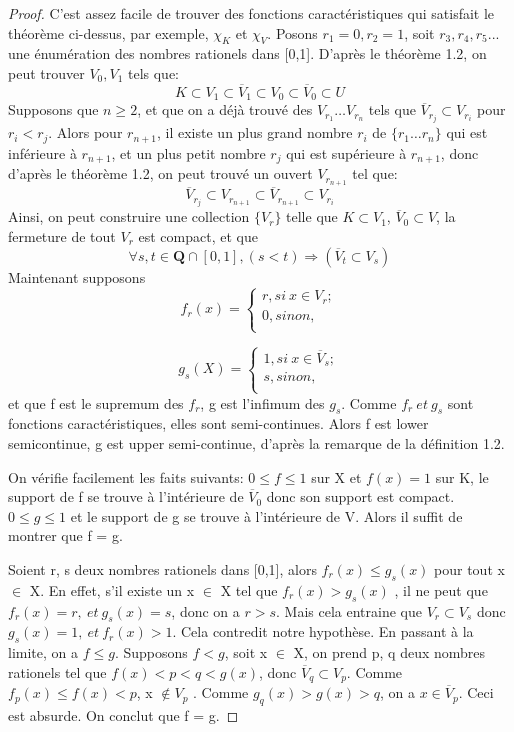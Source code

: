 \documentclass{article}
\begin{document}
\begin{proof}
C'est assez facile de trouver des fonctions caractéristiques qui satisfait le théorème ci-dessus, par exemple, $\chi _{K}$ et $\chi _{V}$.  
Posons $r_{1}=0, r_{2}=1$, soit $r_{3}, r_{4}, r_{5} ...$ une énumération des nombres rationels dans [0,1]. D'après le théorème 1.2, on peut trouver $V_{0}, V_{1}$ tels que: 
\[K \subset V_{1} \subset \overline{V}_{1} \subset V_{0} \subset \overline{V}_{0}\subset U\]
Supposons que $n \geq 2$, et que on a déjà trouvé des $V_{r_{1}} \dots V_{r_{n}}$ tels que $\overline{V}_{r_{j}} \subset V_{r_{i}}$ pour $ r_{i} < r_{j} $. Alors pour $r_{n+1}$, il existe un plus grand nombre $r_{i}$ de $\{r_{1} \dots r_{n}\}$ qui est inférieure à $r_{n+1}$, et un plus petit nombre $r_{j}$ qui est supérieure à $r_{n+1}$, donc d'après le théorème 1.2, on peut trouvé un ouvert $V_{r_{n+1}}$ tel que:
\[\overline{V}_{r_{j}} \subset V_{r_{n+1}} \subset \overline{V}_{r_{n+1}} \subset V_{r_{i}} \]
Ainsi, on peut construire une collection $\{V_{r}\}$ telle que $K \subset V_{1}$, $\overline{V}_{0} \subset V$, la fermeture de tout $V_{r}$ est compact, et que 
\[ \forall s,t \in \mathbf{Q} \cap [0,1],  ( s < t )  \Rightarrow  (\overline{V}_{t} \subset V_{s} )\]
Maintenant supposons 
\[ f_{r} (x)= 
    \begin{cases}
    r, si\ x \in V_{r} ; \\
    0, sinon, \\
    \end{cases} \]

   \[ 
   g_{s}(X)=
   \begin{cases}
   1, si\ x \in \overline{V}_{s}; \\
   s, sinon, \\   
   \end{cases}
\]
et que f est le supremum des $f_{r}$, g est l'infimum des $g_{s}$. Comme $f_{r} \ et \ g_{s}$ sont fonctions caractéristiques, elles sont semi-continues. Alors f est lower semicontinue, g est upper semi-continue, d'après la remarque de la définition 1.2. \par
On vérifie facilement les faits suivants: $0 \leq f \leq 1$ sur X et $f(x)=1$ sur K, le support de f se trouve à l'intérieure de $\overline{V}_{0}$ donc son support est compact. $0 \leq g \leq 1$ et le support de g se trouve à l'intérieure de V. Alors il suffit de montrer que f = g.\par 
Soient r, s deux nombres rationels dans [0,1], alors $f_{r}(x) \leq  g_{s}(x)$ pour tout x $\in$ X. En effet, s'il existe un x $\in$ X tel que $f_{r}(x) > g_{s}(x)$ , il ne peut que $f_{r}(x)=r, \ et \  g_{s} (x)= s $, donc on a $r > s$. Mais cela entraine que $V_{r} \subset V_{s}$ donc $g_{s}(x) =1, \ et \ f_{r}(x) > 1$. Cela contredit notre hypothèse. 
En passant à la limite, on a $f \leq g$. Supposons $f < g$,  soit x $\in$ X, on prend p, q deux nombres rationels tel que $ f(x)< p < q < g(x) $, donc $\overline{V}_{q} \subset V_{p}$. 
Comme $f_{p}(x) \leq f(x) < p$, x $\notin V_{p}$ . Comme $g_{q} (x) > g(x) > q$, on a $x \in \overline{V}_{p}$. Ceci est absurde. On conclut que f = g.     
\end{proof}
\end{document}
